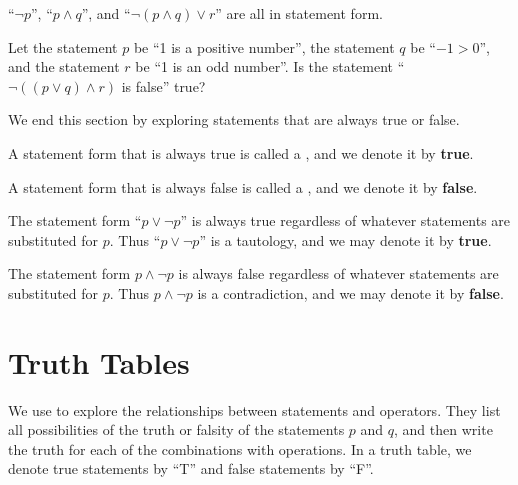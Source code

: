 \begin{example}
    ``$\lnot p$'', ``$p \land q$'', and ``$\lnot(p \land q) \lor r$'' are all in statement form.
\end{example}

\begin{exercise}
    Let the statement $p$ be ``1 is a positive number'', the statement $q$ be ``$-1 > 0$'', and the statement $r$ be ``1 is an odd number''. Is the statement ``$\lnot((p\lor q)\land r)$ is false'' true?
\end{exercise}

We end this section by exploring statements that are always true or false.

\begin{definition}
    A statement form that is always true is called a , and we denote it by \textbf{true}.
\end{definition}

\begin{definition}
    A statement form that is always false is called a , and we denote it by \textbf{false}.
\end{definition}

\begin{example}
    The statement form ``$p \lor \lnot p$'' is always true regardless of whatever statements are substituted for $p$. Thus ``$p \lor \lnot p$'' is a tautology, and we may denote it by \textbf{true}.
\end{example}

\begin{example}
    The statement form $p \land \lnot p$ is always false regardless of whatever statements are substituted for $p$. Thus $p \land \lnot p$ is a contradiction, and we may denote it by \textbf{false}.
\end{example}

\section{Truth Tables}
We use  to explore the relationships between statements and operators. They list all possibilities of the truth or falsity of the statements $p$ and $q$, and then write the truth for each of the combinations with operations. In a truth table, we denote true statements by ``T'' and false statements by ``F''.


